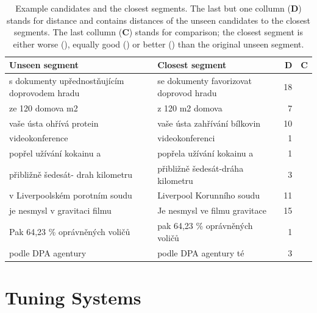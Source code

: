 \begin{table}
  \begin{center}
    \begin{tabular}{|p{5.5cm}p{5.5cm}rc|}
      \hline
      \textbf{Unseen segment} & \textbf{Closest segment} & \textbf{D} & \textbf{C} \\
      \hline
      s dokumenty upřednostňujícím doprovodem hradu & se dokumenty favorizovat doprovod hradu & 18 & \worse{} \\ \hline
      ze 120 domova m2 & z 120 m2 domova & 7 & \better{} \\ \hline
      vaše ústa ohřívá protein & vaše ústa zahřívání bílkovin & 10 & \better{} \\ \hline
      videokonference & videokonferenci & 1 & \better{} \\ \hline
      popřel užívání kokainu a & popřela užívání kokainu a & 1 & \worse{} \\ \hline
      přibližně šedesát- drah kilometru & přibližně šedesát-dráha kilometru & 3 & \equal{} \\ \hline
      v Liverpoolském porotním soudu & Liverpool Korunního soudu & 11 & \better{} \\ \hline
      je nesmysl v gravitaci filmu & Je nesmysl ve filmu gravitace & 15 & \better{} \\ \hline
      Pak 64,23 \% oprávněných voličů & pak 64,23 \% oprávněných voličů & 1 & \better{} \\ \hline
      podle DPA agentury & podle DPA agentury té & 3 & \worse{} \\ \hline
    \end{tabular}
  \end{center}

  \caption[Example candidates and the closest segments]{ Example candidates and
    the closest segments. The last but one collumn (\textbf{D}) stands for
    distance and contains distances of the unseen candidates to the closest
    segments. The last collumn (\textbf{C}) stands for comparison; the closest
  segment is either worse (\worse{}), equally good (\equal{}) or better
(\better{}) than the original unseen segment.}

  \label{segments-closest}
\end{table}




\section{Tuning Systems}
\label{tuning-systems}



